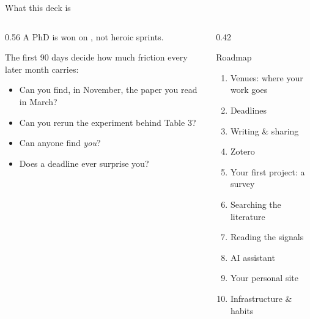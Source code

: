 \documentclass[aspectratio=169,11pt]{beamer}
\begin{document}
\begin{frame}{What this deck is}
\begin{columns}[T]
\begin{column}{0.56\textwidth}
A PhD is won on , not heroic sprints.


\medskip
The first 90 days decide how much friction every later month carries:
\begin{itemize}
  \item Can you find, in November, the paper you read in March?
  \item Can you rerun the experiment behind Table 3?
  \item Can anyone find \emph{you}?
  \item Does a deadline ever surprise you?
\end{itemize}
\end{column}
\begin{column}{0.42\textwidth}
\begin{block}{Roadmap}
\footnotesize
\begin{enumerate}
  \item Venues: where your work goes
  \item Deadlines
  \item Writing \& sharing
  \item Zotero
  \item Your first project: a survey
  \item Searching the literature
  \item Reading the signals
  \item AI assistant
  \item Your personal site
  \item Infrastructure \& habits
\end{enumerate}
\end{block}
\end{column}
\end{columns}
\end{frame}
\end{document}
